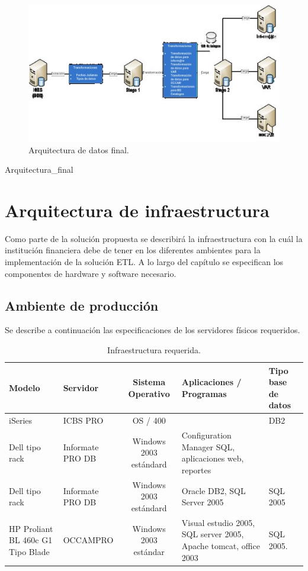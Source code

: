 \begin{figure}[htb]
  \begin{center}
    \includegraphics[width=0.8\linewidth]{Arquitectura_final.jpg}
    \caption{Arquitectura de datos final.}
    \label{fig:arquitectura-de-datos-final}
  \end{center}
\end{figure}

Arquitectura\_final %

\section{Arquitectura de infraestructura}
Como parte de la solución propuesta se describirá la infraestructura con la cuál la institución financiera debe de tener en los diferentes ambientes para la implementación de la solución ETL.
A lo largo del capítulo se especifican los componentes de hardware y software necesario. 

\subsection{Ambiente de producción}
Se describe a continuación las especificaciones de los servidores físicos requeridos.

\begin{table}[htbp]
  \begin{center}
    \begin{tabular}{|p{6cm}|>{\centering\arraybackslash}m{3cm}|c|}
      \hline
      Modelo & Servidor & Sistema Operativo &  Aplicaciones / Programas & Tipo base de datos\\
      \hline
      iSeries & ICBS PRO & OS / 400 &  & DB2 \\
      \hline
      Dell tipo rack & Informate PRO DB & Windows 2003 estándard & Configuration Manager SQL, aplicaciones web, reportes & \\
      \hline
      Dell tipo rack & Informate PRO DB & Windows 2003 estándard & Oracle DB2, SQL Server 2005 & SQL 2005\\
      \hline
      HP Proliant BL 460c G1 Tipo Blade & OCCAMPRO & Windows 2003 estándar & Visual estudio 2005, SQL server 2005, Apache tomcat, office 2003 & SQL 2005.\\
      \hline
    \end{tabular}
    \caption{Infraestructura requerida.}
    \label{tab:infraestructura requerida}
 \end{center}
\end{table}

